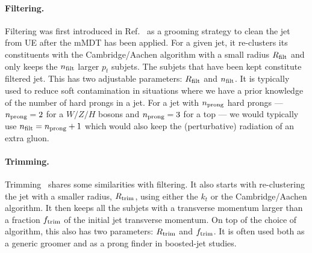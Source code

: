 \paragraph{Filtering.} Filtering was first introduced in
Ref.~\cite{Butterworth:2008iy} as a grooming strategy to clean the jet
from UE after the mMDT has been applied. For a given jet, it
re-clusters its constituents with the Cambridge/Aachen algorithm with
a small radius $R_{\rm filt}$ and only keeps the $n_{\rm filt}$ larger
$p_t$ subjets. The subjets that have been kept constitute filtered jet.
%
This has two adjustable parameters: $R_{\rm filt}$ and $n_{\rm filt}$.
%
It is typically used to reduce soft contamination in situations where
we have a prior knowledge of the number of hard prongs in a
jet. For a jet with $n_{\rm prong}$ hard prongs --- $n_{\rm prong}=2$
for a $W/Z/H$ bosons and $n_{\rm prong}=3$ for a top --- we would
typically use $n_{\rm filt}=n_{\rm prong}+1$ which would also keep the
(perturbative) radiation of an extra gluon.

\paragraph{Trimming.} Trimming~\cite{Krohn:2009th} shares some
similarities with filtering. It also starts with re-clustering the jet
with a smaller radius, $R_{\rm trim}$, using either the $k_t$ or the
Cambridge/Aachen algorithm. It then keeps all the subjets with a
transverse momentum larger than a fraction $f_{\rm trim}$ of the
initial jet transverse momentum.
%
On top of the choice of algorithm, this also has two parameters:
$R_{\rm trim}$ and $f_{\rm trim}$.
%
It is often used both as a generic groomer and as a prong finder in boosted-jet
studies.


